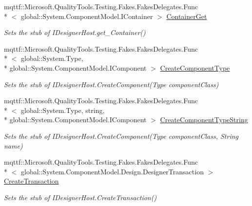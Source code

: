 \begin{DoxyCompactItemize}
mqttf\-::\-Microsoft.\-Quality\-Tools.\-Testing.\-Fakes.\-Fakes\-Delegates.\-Func\\*
$<$ global\-::\-System.\-Component\-Model.\-I\-Container $>$ \hyperlink{class_system_1_1_component_model_1_1_design_1_1_serialization_1_1_fakes_1_1_stub_i_designer_loader_host2_a890bc080cf91a74461c09c63321a2e09}{Container\-Get}
\begin{DoxyCompactList}\small\item\em Sets the stub of I\-Designer\-Host.\-get\-\_\-\-Container()\end{DoxyCompactList}\item 
mqttf\-::\-Microsoft.\-Quality\-Tools.\-Testing.\-Fakes.\-Fakes\-Delegates.\-Func\\*
$<$ global\-::\-System.\-Type, \\*
global\-::\-System.\-Component\-Model.\-I\-Component $>$ \hyperlink{class_system_1_1_component_model_1_1_design_1_1_serialization_1_1_fakes_1_1_stub_i_designer_loader_host2_a9c73a8d48f89b56ec7a4c022da22a54e}{Create\-Component\-Type}
\begin{DoxyCompactList}\small\item\em Sets the stub of I\-Designer\-Host.\-Create\-Component(\-Type component\-Class)\end{DoxyCompactList}\item 
mqttf\-::\-Microsoft.\-Quality\-Tools.\-Testing.\-Fakes.\-Fakes\-Delegates.\-Func\\*
$<$ global\-::\-System.\-Type, string, \\*
global\-::\-System.\-Component\-Model.\-I\-Component $>$ \hyperlink{class_system_1_1_component_model_1_1_design_1_1_serialization_1_1_fakes_1_1_stub_i_designer_loader_host2_a052038ad4dcca65fedce85d918b1cdb8}{Create\-Component\-Type\-String}
\begin{DoxyCompactList}\small\item\em Sets the stub of I\-Designer\-Host.\-Create\-Component(\-Type component\-Class, String name)\end{DoxyCompactList}\item 
mqttf\-::\-Microsoft.\-Quality\-Tools.\-Testing.\-Fakes.\-Fakes\-Delegates.\-Func\\*
$<$ global\-::\-System.\-Component\-Model.\-Design.\-Designer\-Transaction $>$ \hyperlink{class_system_1_1_component_model_1_1_design_1_1_serialization_1_1_fakes_1_1_stub_i_designer_loader_host2_ad71034bd2a29ff8627654cbbcec0af61}{Create\-Transaction}
\begin{DoxyCompactList}\small\item\em Sets the stub of I\-Designer\-Host.\-Create\-Transaction()\end{DoxyCompactList}\item 

\end{DoxyCompactItemize}
